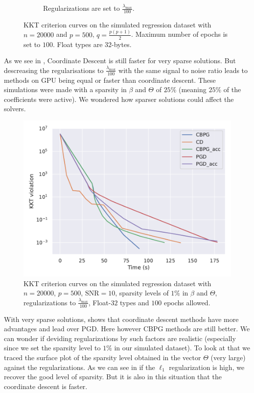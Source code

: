 \documentclass[a4]{article}
\begin{document}
\begin{figure}[ht!]
\begin{subfigure}{.45\textwidth}
		\caption{Regularizations are set to $\frac{\lambda_{\max}}{100}$.}
		\label{fig:simu_ccl_over100}
	\end{subfigure}
	\caption{KKT criterion curves on the simulated regression dataset with $n=20000$ and $p=500$, $q=\frac{p(p+1)}{2}$.
	Maximum number of epochs is set to $100$. Float types are $32$-bytes.
	}
\end{figure}

As we see in , Coordinate Descent is still faster for very sparse solutions. But descreasing the regularisations to $\frac{\lambda_{\max}}{100}$ with the same signal to noise
ratio leads to methods on GPU being equal or faster than coordinate descent. These simulations were made with a sparsity in $\beta$ and $\Theta$ of $25\%$ (meaning $25\%$ of the coefficients were active).
We wondered how sparser solutions could affect the solvers.

\begin{figure}[ht]
	\centering
	\includegraphics[scale=.4]{prebuilt_images/simulated_n20000p500_kkt_snr10_over100_sp.pdf}
	\caption{KKT criterion curves on the simulated regression dataset with $n=20000$, $p=500$, $\mathrm{SNR}=10$, sparsity levels of $1\%$ in $\beta$ and $\Theta$, regularizations to $\frac{\lambda_{\max}}{100}$, Float-$32$ types and $100$ epochs allowed.}
	\label{fig:sparsity_solvers}
\end{figure}

With very sparse solutions,  shows that coordinate descent methods have more advantages and lead over PGD. Here however CBPG methods are still better.
We can wonder if deviding regularizations by such factors are realistic (especially since we set the sparsity level to $1\%$ in our simulated dataset). To look at that we traced the surface plot
of the sparsity level obtained in the vector $\Theta$ (very large) against the regularizations. As we can see in  if the $\ell_1$ regularization is high, we recover the good level of sparsity.
But it is also in this situation that the coordinate descent is faster.
\end{document}
